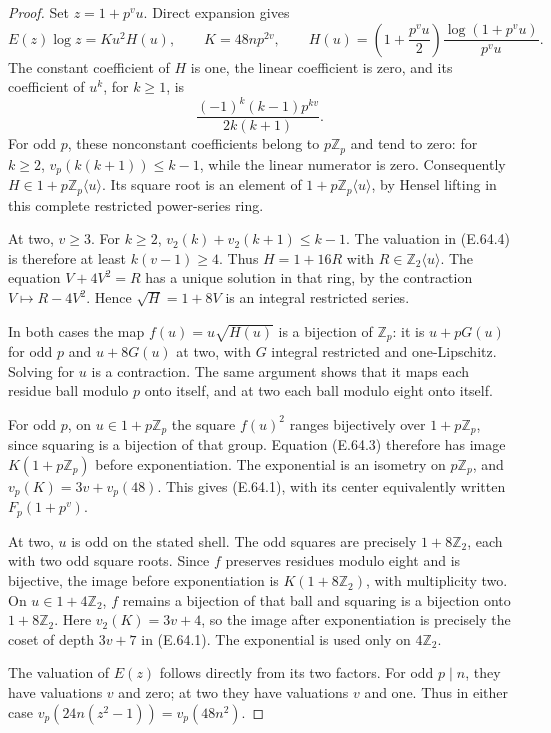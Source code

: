 \begin{proof}
Set $z=1+p^vu$. Direct expansion gives
\[
 E(z)\log z=K u^2 H(u),\qquad
 K=48n p^{2v},\qquad
 H(u)=\left(1+\frac{p^vu}{2}\right)
       \frac{\log(1+p^vu)}{p^vu}.
 \tag{E.64.3}
\]
The constant coefficient of $H$ is one,
the linear coefficient is zero, and
its coefficient of $u^k$, for $k\geq1$,
is
\[
       \frac{(-1)^k(k-1)p^{kv}}{2k(k+1)}.
 \tag{E.64.4}
\]
For odd $p$, these nonconstant
coefficients belong to $p\mathbb Z_p$
and tend to zero: for $k\geq2$,
$v_p(k(k+1))\leq k-1$, while the
linear numerator is zero. Consequently
$H\in1+p\mathbb Z_p\langle u\rangle$.
Its square root is an element of
$1+p\mathbb Z_p\langle u\rangle$,
by Hensel lifting in this complete
restricted power-series ring.

At two, $v\geq3$. For $k\geq2$,
$v_2(k)+v_2(k+1)\leq k-1$.
The valuation in (E.64.4) is therefore
at least $k(v-1)\geq4$.
Thus $H=1+16R$ with
$R\in\mathbb Z_2\langle u\rangle$.
The equation
$V+4V^2=R$ has a unique solution in
that ring, by the contraction
$V\mapsto R-4V^2$. Hence
$\sqrt H=1+8V$ is an integral
restricted series.

In both cases the map
$f(u)=u\sqrt{H(u)}$ is a bijection of
$\mathbb Z_p$: it is $u+pG(u)$
for odd $p$ and $u+8G(u)$ at two,
with $G$ integral restricted and
one-Lipschitz. Solving for $u$
is a contraction. The same argument
shows that it maps each residue ball
modulo $p$ onto itself, and at two
each ball modulo eight onto itself.

For odd $p$, on $u\in1+p\mathbb Z_p$
the square $f(u)^2$ ranges bijectively
over $1+p\mathbb Z_p$, since squaring
is a bijection of that group.
Equation (E.64.3) therefore has image
$K(1+p\mathbb Z_p)$ before exponentiation.
The exponential is an isometry on
$p\mathbb Z_p$, and
$v_p(K)=3v+v_p(48)$.
This gives (E.64.1), with its center
equivalently written $F_p(1+p^v)$.

At two, $u$ is odd on the stated
shell. The odd squares are precisely
$1+8\mathbb Z_2$, each with two odd
square roots. Since $f$ preserves
residues modulo eight and is bijective,
the image before exponentiation is
$K(1+8\mathbb Z_2)$, with multiplicity
two. On $u\in1+4\mathbb Z_2$,
$f$ remains a bijection of that
ball and squaring is a bijection
onto $1+8\mathbb Z_2$.
Here $v_2(K)=3v+4$, so the image
after exponentiation is precisely
the coset of depth $3v+7$ in
(E.64.1). The exponential is
used only on $4\mathbb Z_2$.

The valuation of $E(z)$ follows
directly from its two factors.
For odd $p\mid n$, they have
valuations $v$ and zero;
at two they have valuations $v$
and one. Thus in either case
$v_p(24n(z^2-1))=v_p(48n^2)$.


\end{proof}
